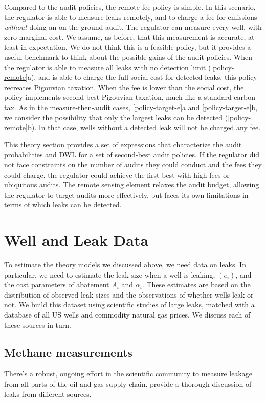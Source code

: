 \documentclass[12pt,oneside,letterpaper]{article}
\theoremstyle{definition}
\begin{document}
\begin{refsection}
Compared to the audit policies, the remote fee policy is simple.
In this scenario, the regulator is able to measure leaks remotely, and to charge a fee for emissions \emph{without} doing an on-the-ground audit.
The regulator can measure every well, with zero marginal cost.
We assume, as before, that this measurement is accurate, at least in expectation.
We do not think this is a feasible policy, but it provides a useful benchmark to think about the possible gains of the audit policies.
When the regulator is able to measure all leaks with no detection limit (\ref{policy-remote}a), and is able to charge the full social cost for detected leaks, this policy recreates Pigouvian taxation.
When the fee is lower than the social cost, the policy implements second-best Pigouvian taxation, much like a standard carbon tax.
As in the measure-then-audit cases, \ref{policy-target-e}a and \ref{policy-target-e}b, we consider the possibility that only the largest leaks can be detected (\ref{policy-remote}b).
In that case, wells without a detected leak will not be charged any fee.



This theory section provides a set of expressions that characterize the audit probabilities and \gls{DWL} for a set of second-best audit policies.
If the regulator did not face constraints on the number of audits they could conduct and the fees they could charge, the regulator could achieve the first best with high fees or ubiquitous audits.
The remote sensing element relaxes the audit budget, allowing the regulator to target audits more effectively, but faces its own limitations in terms of which leaks can be detected.

\section{Well and Leak Data}
\label{sec:well-and-leak-data}

To estimate the theory models we discussed above, we need data on leaks.
In particular, we need to estimate the leak size when a well is leaking, \((e_i)\), and the cost parameters of abatement \(A_i\) and \(\alpha_i\).
These estimates are based on the distribution of observed leak sizes and the observations of whether wells leak or not.
We build this dataset using scientific studies of large leaks, matched with a database of all US wells and commodity natural gas prices.
We discuss each of these sources in turn.


\subsection{Methane measurements}
\label{sec:methane-measures}
There's a robust, ongoing effort in the scientific community to measure leakage from all parts of the oil and gas supply chain.
\textcite{Alvarez/etal:2018} provide a thorough discussion of leaks from different sources.


\end{refsection}
\end{document}
